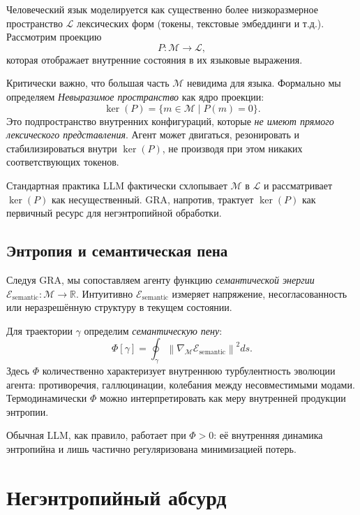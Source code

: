 \documentclass[conference]{IEEEtran}
\begin{document}
Человеческий язык моделируется как существенно более низкоразмерное пространство $\mathcal{L}$
лексических форм (токены, текстовые эмбеддинги и т.д.).
Рассмотрим проекцию
\begin{equation}
  P : \mathcal{M} \to \mathcal{L},
\end{equation}
которая отображает внутренние состояния в их языковые выражения.

Критически важно, что большая часть $\mathcal{M}$ невидима для языка.
Формально мы определяем \emph{Невыразимое пространство} как ядро
проекции:
\begin{equation}
  \ker(P) = \{ m \in \mathcal{M} \mid P(m) = 0 \}.
\end{equation}
Это подпространство внутренних конфигураций, которые
\emph{не имеют прямого лексического представления}.
Агент может двигаться, резонировать и стабилизироваться внутри $\ker(P)$,
не производя при этом никаких соответствующих токенов.

Стандартная практика LLM фактически схлопывает $\mathcal{M}$ в $\mathcal{L}$
и рассматривает $\ker(P)$ как несущественный.
GRA, напротив, трактует $\ker(P)$ как первичный ресурс
для негэнтропийной обработки.

\subsection{Энтропия и семантическая пена}

Следуя GRA, мы сопоставляем агенту функцию \emph{семантической энергии}
$\mathcal{E}_{\text{semantic}} : \mathcal{M} \to \mathbb{R}$.
Интуитивно $\mathcal{E}_{\text{semantic}}$ измеряет напряжение,
несогласованность или неразрешённую структуру в текущем состоянии.

Для траектории $\gamma$ определим \emph{семантическую пену}:
\begin{equation}
  \Phi[\gamma] = \oint_{\gamma}
    \left\|
      \nabla_{\mathcal{M}} \mathcal{E}_{\text{semantic}}
    \right\|^2 ds.
\end{equation}
Здесь $\Phi$ количественно характеризует внутреннюю турбулентность эволюции агента:
противоречия, галлюцинации, колебания между несовместимыми модами.
Термодинамически $\Phi$ можно интерпретировать
как меру внутренней продукции энтропии.

Обычная LLM, как правило, работает при $\Phi > 0$:
её внутренняя динамика энтропийна и лишь частично регуляризована
минимизацией потерь.

\section{Негэнтропийный абсурд}
\end{document}
